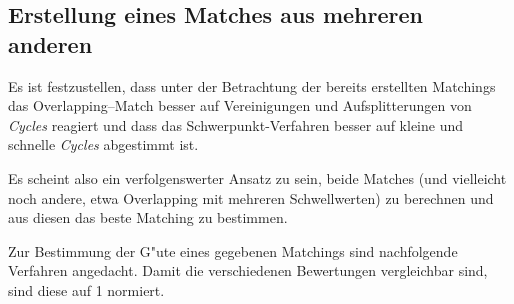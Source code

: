\subsection{Erstellung eines Matches aus mehreren anderen}\label{bewertung}


Es ist festzustellen, dass unter der Betrachtung der bereits erstellten Matchings das Overlapping--Match besser auf Vereinigungen und Aufsplitterungen von \textit{Cycles} reagiert und dass das Schwerpunkt-Verfahren besser auf kleine und schnelle \textit{Cycles} abgestimmt ist. 

Es scheint also ein verfolgenswerter Ansatz zu sein, beide Matches (und vielleicht noch andere, etwa Overlapping mit mehreren Schwellwerten) zu berechnen und aus diesen das beste Matching zu bestimmen. 

Zur Bestimmung der G"ute eines gegebenen Matchings sind nachfolgende Verfahren angedacht. Damit die verschiedenen Bewertungen vergleichbar sind, sind diese auf 1 normiert.

